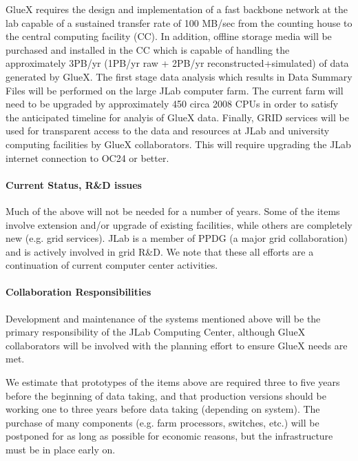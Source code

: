 \documentclass[11pt]{article}
\begin{document}
GlueX requires the design and
implementation of a fast backbone network at the lab capable of 
a sustained transfer rate of 100 MB/sec from the counting house to the central
computing facility (CC). In addition, offline storage media will be purchased
and installed in the CC which is capable of handling the approximately 3PB/yr
(1PB/yr raw + 2PB/yr reconstructed+simulated) of data generated by GlueX.
The first
stage data analysis which results in Data Summary Files will be performed
on the large JLab computer farm. The current farm will need to be upgraded
by approximately 450 circa 2008 CPUs in order to satisfy the anticipated
timeline for analyis of GlueX data. Finally, GRID services will be
used for transparent access to the data and resources
at JLab and university computing facilities by GlueX collaborators. This
will require upgrading the JLab internet connection to OC24 or better.



\paragraph{Current Status, R\&D issues}


Much of the above will not be needed for a number of years.  Some of
the items involve extension and/or upgrade of existing facilities,
while others are completely new (e.g. grid services).  JLab is a
member of PPDG (a major grid collaboration) and is actively involved
in grid R\&D.  We note that these all efforts are a continuation of
current computer center activities.



\paragraph{Collaboration Responsibilities}


Development and maintenance of the systems mentioned above will be the
primary responsibility of the JLab Computing Center, although GlueX
collaborators will be involved with the planning effort to
ensure GlueX needs are met.  


We estimate that prototypes of the items above are required
three to five years before the beginning of data taking, and
that production versions should be working one to three years before
data taking (depending on system).  The purchase of
many components (e.g. farm processors, switches, etc.) will be
postponed for as long as possible for economic reasons, but the
infrastructure must be in place early on.
\end{document}
